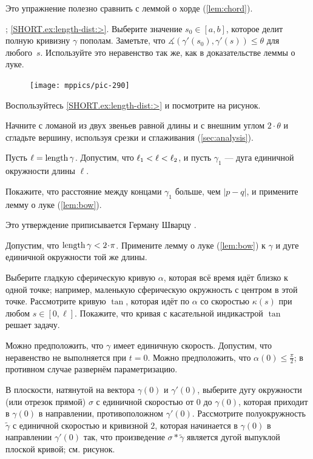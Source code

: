 \begin{multicols}{2}
Это упражнение полезно сравнить с леммой о хорде (\ref{lem:chord}).

\parbf{\ref{ex:length-dist}}; \ref{SHORT.ex:length-dist:>}.
Выберите значение $s_0\in[a,b]$, которое делит полную кривизну $\gamma$ пополам.
Заметьте, что $\measuredangle(\gamma'(s_0),\gamma'(s))\le \theta$ для любого~$s$.
Используйте это неравенство так же, как в доказательстве леммы о луке.

\begin{figure}
\vskip-5mm
\centering
\texttt{[image: mppics/pic-290]}
\vskip-0mm
\end{figure}

Воспользуйтесь \ref{SHORT.ex:length-dist:>} и посмотрите на рисунок.


Начните с ломаной из двух звеньев равной длины и с внешним углом $2\cdot\theta$ и сгладьте вершину, используя срезки и сглаживания (\ref{sec:analysis}).

Пусть $\ell=\mathop{\rm length}\nolimits\gamma$.
Допустим, что $\ell_1\z<\ell<\ell_2$, и пусть $\gamma_1$ --- дуга единичной окружности длины $\ell$.

Покажите, что расстояние между концами $\gamma_1$ больше, чем $|p-q|$, и примените лемму о луке (\ref{lem:bow}).

 Это утверждение приписывается Герману Шварцу \cite{shur}.

Допустим, что $\length\gamma<2\cdot\pi$. 
Примените лемму о луке (\ref{lem:bow}) к $\gamma$ и дуге единичной окружности той же длины.

Выберите гладкую сферическую кривую $\alpha$, которая всё время идёт близко к одной точке;
например, маленькую сферическую окружность с центром в этой точке.
Рассмотрите кривую $\tan$, которая идёт по $\alpha$ со скоростью $\kappa(s)$ при любом $s\in [0,\ell]$.
Покажите, что кривая с касательной индикастрой $\tan$ решает задачу.

Можно предположить, что $\gamma$ имеет единичную скорость.
Допустим, что неравенство не выполняется при $t=0$.
Можно предположить, что $\alpha(0)\le\tfrac\pi2$;
в противном случае развернём параметризацию.

В плоскости, натянутой на вектора $\gamma(0)$ и $\gamma'(0)$, выберите дугу окружности (или отрезок прямой) $\sigma$ с единичной скоростью от $0$ до $\gamma(0)$, которая приходит в $\gamma(0)$ в направлении, противоположном $\gamma'(0)$.
Рассмотрите полуокружность $\tilde\gamma$ с единичной скоростью и кривизной $2$, которая начинается в $\gamma(0)$ в направлении $\gamma'(0)$ так, что произведение $\sigma*\tilde\gamma$ является дугой выпуклой плоской кривой; см. рисунок.


\end{multicols}
